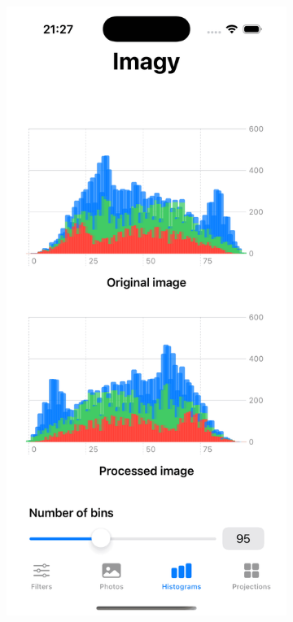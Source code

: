 \documentclass[a4paper]{article}
\begin{document}
\begin{figure}[H]
\begin{subfigure}{0.2\textwidth}
        \label{fig:histogram_26}
    \end{subfigure}
    \hfill
    \begin{subfigure}{0.2\textwidth}
        \centering
        \includegraphics[width=\linewidth]{images/histogram_95.png}

\end{subfigure}
\end{figure}
\end{document}
